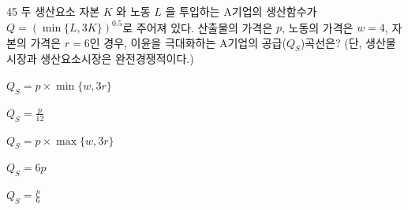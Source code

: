 \begin{question}{45}
두 생산요소 자본 $K$ 와 노동 $L$ 을 투입하는 A기업의 생산함수가 $Q=(\min\{L, 3K\})^{ 0.5 }$로 주어져 있다. 산출물의 가격은 $p$, 노동의 가격은 $w=4$, 자본의 가격은 $r=6$인 경우, 이윤을 극대화하는 A기업의 공급($Q_{ S }$)곡선은? (단, 생산물시장과 생산요소시장은 완전경쟁적이다.)
\begin{choices}
  \item $Q_{ S } =p \times \min\{w, 3r\}$
  \item $Q_{ S } = \frac{ p } { 12 }$
  \item $Q_{ S } =p \times \max\{w, 3r\}$
  \item $Q_{ S } =6p$
  \item $Q_{ S } = \frac{ p } { 6 }$
\end{choices}
\end{question}
